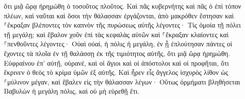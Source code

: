 \documentclass{openreader}
\begin{document}
ὅτι μιᾷ ὥρᾳ ἠρημώθη ὁ τοσοῦτος πλοῦτος. Καὶ πᾶς κυβερνήτης καὶ πᾶς ὁ ἐπὶ τόπον πλέων, καὶ ναῦται καὶ ὅσοι τὴν θάλασσαν ἐργάζονται, ἀπὸ μακρόθεν ἔστησαν 
καὶ ⸀ἔκραξαν βλέποντες τὸν καπνὸν τῆς πυρώσεως αὐτῆς λέγοντες· Τίς ὁμοία τῇ πόλει τῇ μεγάλῃ; 
καὶ ἔβαλον χοῦν ἐπὶ τὰς κεφαλὰς αὐτῶν καὶ ⸀ἔκραξαν κλαίοντες καὶ ⸀πενθοῦντες λέγοντες· Οὐαὶ οὐαί, ἡ πόλις ἡ μεγάλη, ἐν ᾗ ἐπλούτησαν πάντες οἱ ἔχοντες τὰ πλοῖα ἐν τῇ θαλάσσῃ ἐκ τῆς τιμιότητος αὐτῆς, ὅτι μιᾷ ὥρᾳ ἠρημώθη. 
Εὐφραίνου ἐπ’ αὐτῇ, οὐρανέ, καὶ οἱ ἅγιοι καὶ οἱ ἀπόστολοι καὶ οἱ προφῆται, ὅτι ἔκρινεν ὁ θεὸς τὸ κρίμα ὑμῶν ἐξ αὐτῆς. 
Καὶ ἦρεν εἷς ἄγγελος ἰσχυρὸς λίθον ὡς ⸀μύλινον μέγαν, καὶ ἔβαλεν εἰς τὴν θάλασσαν λέγων· Οὕτως ὁρμήματι βληθήσεται Βαβυλὼν ἡ μεγάλη πόλις, καὶ οὐ μὴ εὑρεθῇ ἔτι. 
\end{document}
